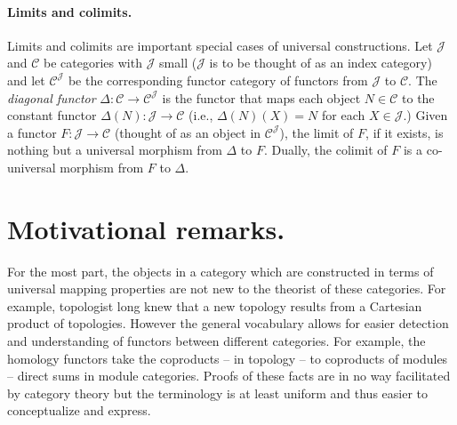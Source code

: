 \documentclass[12pt]{article}
\begin{document}
\paragraph{Limits and colimits.}
Limits and colimits are important special
cases of universal constructions. Let $\mathcal{J}$ and $\mathcal{C}$ be categories
with $\mathcal{J}$ small ($\mathcal{J}$ is to be thought of as an index
category) and let $\mathcal{C}^\mathcal{J}$ be the corresponding functor
category of functors from $\mathcal{J}$ to $\mathcal{C}$. The \emph{diagonal functor}
$\Delta \colon \mathcal{C} \to 
\mathcal{C}^\mathcal{J}$ is the functor that maps each object $N\in\mathcal{C}$
to the constant functor $\Delta(N) \colon \mathcal{J} \to \mathcal{C}$
(i.e., $\Delta(N)(X) = N$ for each $X\in \mathcal{J}$.)
Given a functor $F \colon \mathcal{J} \to \mathcal{C}$ (thought of as an object in
$\mathcal{C}^\mathcal{J}$), the limit of $F$, if it exists, is
nothing but a universal morphism from $\Delta$ to $F$. Dually, the
colimit of $F$ is a co-universal morphism from $F$ to $\Delta$.

\section{Motivational remarks.}

For the most part, the objects in a category which are constructed in terms of universal mapping properties are not new to the theorist of these categories.  For example,
topologist long knew that a new topology results from a Cartesian product
of topologies.  However the general vocabulary allows for easier detection and understanding of functors between different categories.  For example, the
homology functors take the coproducts --  in topology -- to
coproducts of modules -- direct sums in module categories.  Proofs of these
facts are in no way facilitated by category theory but the terminology is
at least uniform and thus easier to conceptualize and express.
\end{document}
